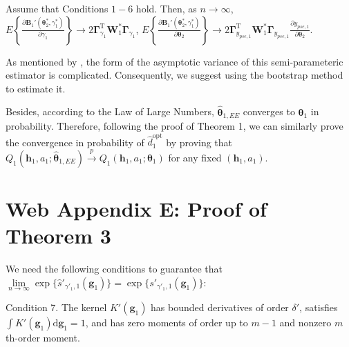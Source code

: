 \documentclass[12pt]{article}
\begin{document}
Assume that Conditions $1-6$ hold. Then, as $n \rightarrow \infty$, $E\left\{\frac{\partial \bm{B}_1'(\bm{\theta}_2^*,\gamma_1^*)}{\partial \gamma_1}\right\} \to 2\bm{\Gamma}_{\gamma_1}^{\mathrm{T}}\bm{W}_1^*\bm{\Gamma}_{\gamma_1}$, $E\left\{\frac{\partial \bm{B}_1'(\bm{\theta}_2^*,\gamma_1^*)}{\partial \bm{\theta}_2}\right\} \to 2\bm{\Gamma}_{y_{pse,1}}^{\mathrm{T}}\bm{W}_1^*\bm{\Gamma}_{y_{pse,1}}\frac{\partial y_{pse,1}}{\partial \bm{\theta}_2}$. 

As mentioned by \cite{Shao_Wang_2016}, the form of the asymptotic variance of this semi-parameteric estimator is complicated. Consequently, we suggest using the bootstrap method to estimate it.

Besides, according to the Law of Large Numbers, $\widehat{\bm{\theta}}_{1,EE}$ converges to $\bm{\theta}_1$ in probability. Therefore, following the proof of Theorem 1, we can similarly prove the convergence in probability of $\widehat{d}^{\mathrm{opt}}_1$ by proving that $Q_1(\bm{h}_1,a_1;\widehat{\bm{\theta}}_{1,EE}) \stackrel{p}{\longrightarrow} Q_1(\bm{h}_1,a_1;\bm{\theta}_{1})$ for any fixed $(\bm{h}_1,a_1)$.  


\section{Web Appendix E: Proof of Theorem 3}

We need the following conditions to guarantee that $\lim\limits_{n\to \infty}\exp\{\widehat{s}'_{\gamma'_1,1}(\bm{g}_1) \} = \exp\{s'_{\gamma'_1,1}(\bm{g}_1) \}$:

Condition 7. The kernel $K'(\bm{g}_1)$ has bounded derivatives of order $\delta'$, satisfies \\ $\int K'(\bm{g}_1) \mathrm{d} \bm{g}_1=1$, and has zero moments of order up to $m-1$ and nonzero $m$ th-order moment.
\end{document}
